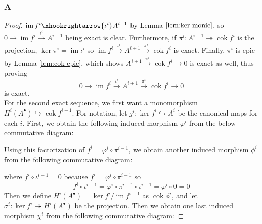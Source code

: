 \documentclass{article}
\DeclareMathOperator{\im}{\mathrm{im}}
\DeclareMathOperator{\cok}{\mathrm{cok}}
\begin{document}
\subsubsection{A}\label{1.6.A}
\begin{proof}
    $\im f^i\xhookrightarrow{\iota^i} A^{i+1}$ by Lemma $\ref{lem:ker monic}$, so $0\rightarrow \im f^i \xrightarrow{\iota^i} A^{i+1}$ being exact is clear. Furthermore, if $\pi^i:A^{i+1}\twoheadrightarrow \cok f^i$ is the projection, $\ker \pi^i=\im \iota^i$ so $\im f^i \xrightarrow{\iota^i} A^{i+1}\xrightarrow{\pi^i} \cok f^i$ is exact. Finally, $\pi^i$ is epic by Lemma \ref{lem:cok epic}, which shows $A^{i+1}\xrightarrow{\pi^i} \cok f^i\rightarrow 0$ is exact as well, thus proving
    \[
    0\rightarrow \im f^i\xrightarrow{\iota^i} A^{i+1}\xrightarrow{\pi^i} \cok f^i \rightarrow 0
    \]
    is exact.\\
    For the second exact sequence, we first want a monomorphism $H^i(A^\bullet)\hookrightarrow \cok f^{i-1}$. For notation, let $j^i:\ker f^i\hookrightarrow A^i$ be the canonical maps for each $i$. First, we obtain the following induced morphism $\varphi^i$ from the below commutative diagram:
    \begin{center}
    \end{center}
    Using this factorization of $f^i=\varphi^i\circ \pi^{i-1}$, we obtain another induced morphism $\phi^i$ from the following commutative diagram:
    \begin{center}
    \end{center}
    where $f^i\circ \iota^{i-1}=0$ because $f^i=\varphi^i\circ \pi^{i-1}$ so
    \[
    f^i\circ \iota^{i-1}=\varphi^i\circ \pi^{i-1}\circ \iota^{i-1}=\varphi^i\circ 0=0
    \]
    Then we define $H^i(A^\bullet)=\ker f^i/\im f^{i-1}$ as $\cok \phi^i$, and let $\sigma^i:\ker f^i \twoheadrightarrow H^i(A^\bullet)$ be the projection. Then we obtain one last induced morphism $\chi^i$ from the following commutative diagram:

\end{proof}
\end{document}
